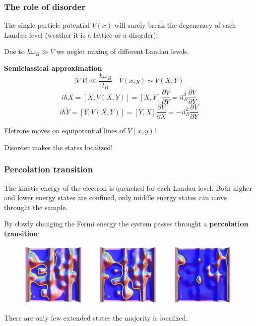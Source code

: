 \documentclass{beamer}
\begin{document}
\begin{frame}
\frametitle{The role of disorder}
\begin{center}
The single particle potential $V(x)$ will surely break the degeneracy of each Landau level (weather it is a lattice or a disorder).
\begin{block}
\centering
Due to $\hbar \omega_B \gg V$ we neglet mixing of different Landau levels.
\centering
\end{block}
\textbf{Semiclassical approximation}
\[
|\nabla V| \ll \frac{\hbar \omega_B}{l_B} \quad V(x, y) \sim V(X, Y) 
\]
\[
i \hbar \dot{X} = [X, V(X, Y)] = [X, Y] \frac{\partial V}{\partial Y} = i l_B^2 \frac{\partial V}{\partial Y}
\]
\[
i \hbar \dot{Y} = [Y, V(X, Y)] = [Y, X] \frac{\partial V}{\partial X} = - i l_B^2 \frac{\partial V}{\partial Y}
\]

Eletrons moves on equipotential lines of $V(x, y)$!
\begin{block}
\centering
Disorder makes the states localized!
\centering
\end{block}

\end{center}
\end{frame}

\begin{frame} 
\frametitle{Percolation transition}
\begin{center}
The kinetic energy of the electron is quenched for each Landau level. Both higher and lower energy states are confined, only middle energy states can move throught the sample.

By slowly changing the Fermi energy the system passes throught a \textbf{percolation transition}:

\begin{figure}[!htb]
\centering
\includegraphics[scale=0.3]{percolation.png}
\end{figure}

There are only few extended states the majority is localized.

\end{center}
\end{frame}
\end{document}
